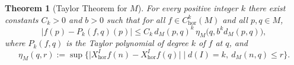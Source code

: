 \documentclass[12pt]{amsart}
\newtheorem{theorem}{Theorem}[section]
\begin{document}

\begin{theorem}[Taylor Theorem for $M$]\label{TaylorQuotients}
For every positive integer $k$ there exist constants $C_k>0$ and $b>0$ such that
for all $f\in C^k_{\mathrm{hor}}(M)$ and all $p,q\in M$,
\begin{equation}\label{eq:Taylor-M}
\big| f(p)- P_k(f,q)(p)\big|
\leq
C_k\, d_M(p,q)^k\,
\eta_M\big(q,b^k d_M(p,q)\big),
\end{equation}
where $P_k(f,q)$ is the  Taylor polynomial of degree $k$ of $f$ at $q$,
and
\[
\eta_M(q,r)
:=
\sup\big\{
\big| X_{\mathrm{hor}}^I f(n)-X_{\mathrm{hor}}^I f(q)\big|
\;\big|\;
d(I)=k,\ d_M(n,q)\le r
\big\}.
\]
\end{theorem}
\end{document}
